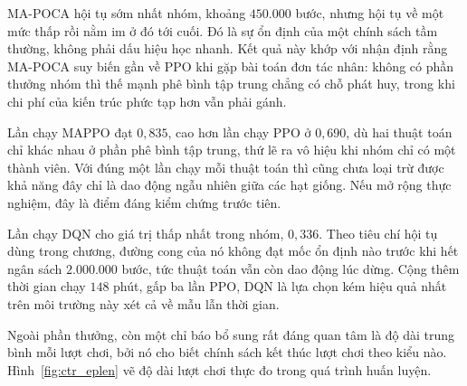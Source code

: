 \indent MA-POCA hội tụ sớm nhất nhóm, khoảng $450.000$ bước, nhưng hội tụ về một mức thấp rồi
nằm im ở đó tới cuối. Đó là sự ổn định của một chính sách tầm thường,
không phải dấu hiệu học nhanh. Kết quả này khớp với nhận định rằng MA-POCA suy biến gần về
PPO khi gặp bài toán đơn tác nhân: không có phần thưởng nhóm thì thế mạnh phê bình tập
trung chẳng có chỗ phát huy, trong khi chi phí của kiến trúc phức tạp hơn vẫn phải gánh.

\indent Lần chạy MAPPO đạt $0{,}835$, cao hơn lần chạy PPO ở $0{,}690$, dù hai thuật toán chỉ
khác nhau ở phần phê bình tập trung, thứ lẽ ra vô hiệu khi nhóm chỉ có một thành viên. Với đúng
một lần chạy mỗi thuật
toán thì cũng chưa loại trừ được khả năng đây chỉ là dao động ngẫu nhiên giữa các hạt
giống. Nếu mở rộng thực nghiệm, đây là điểm đáng kiểm chứng trước tiên.

\indent Lần chạy DQN cho giá trị thấp nhất trong nhóm, $0{,}336$. Theo tiêu chí
hội tụ dùng trong chương, đường cong của nó không đạt mốc ổn định nào trước khi hết ngân sách
$2.000.000$ bước, tức thuật toán vẫn còn dao động lúc dừng. Cộng thêm thời gian chạy $148$ phút,
gấp ba lần PPO, DQN là lựa chọn kém hiệu quả nhất trên môi
trường này xét cả về mẫu lẫn thời gian.

\indent Ngoài phần thưởng, còn một chỉ báo bổ sung rất đáng quan tâm là độ dài trung bình
mỗi lượt chơi, bởi nó cho biết chính sách kết thúc lượt chơi theo kiểu nào.
Hình~\ref{fig:ctr_eplen} vẽ độ dài lượt chơi thực đo trong quá trình huấn luyện.


